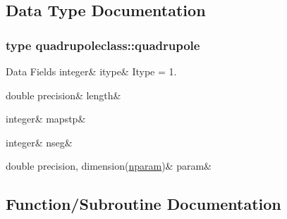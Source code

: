 \subsection{Data Type Documentation}
\label{structquadrupoleclass_1_1quadrupole}
\subsubsection{type quadrupoleclass\+::quadrupole}
\begin{DoxyFields}{Data Fields}
\mbox{\label{namespacequadrupoleclass_addaf50b0cff1aec9fc452925c7819bdb}} 
integer&
itype&
Itype = 1. \\
\hline

\mbox{\label{namespacequadrupoleclass_ac84e0debf991be5cd71ee964781dd7af}} 
double precision&
length&
\\
\hline

\mbox{\label{namespacequadrupoleclass_a283a967adb1fb9dd7c742b5ce97ef3a0}} 
integer&
mapstp&
\\
\hline

\mbox{\label{namespacequadrupoleclass_afece7d333f73554720932318f413f11b}} 
integer&
nseg&
\\
\hline

\mbox{\label{namespacequadrupoleclass_ab9bcd11b6a6e1b6d7242eb243029393f}} 
double precision, dimension(\mbox{\hyperlink{namespacequadrupoleclass_a8eba81bd9796e431c21d0f46260b0c6c}{nparam}})&
param&
\\
\hline

\end{DoxyFields}


\subsection{Function/\+Subroutine Documentation}
\mbox{\label{namespacequadrupoleclass_afebabbf596b8330dcdbc2741bb939b5c}} 
